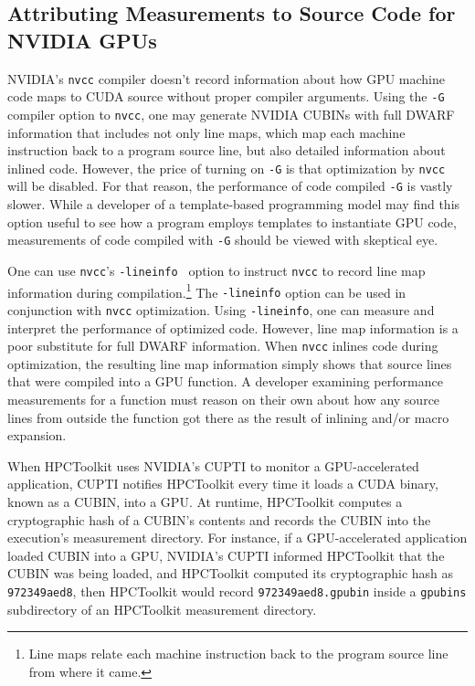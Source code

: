\subsection{Attributing Measurements to Source Code for NVIDIA GPUs}

NVIDIA's {\tt nvcc} compiler doesn't record information about how GPU machine code maps to CUDA source without proper compiler arguments. Using the {\tt -G} compiler option to {\tt nvcc}, one may generate NVIDIA CUBINs with full DWARF information that includes not only line maps, which map each machine instruction back to a program source line, but also detailed information about inlined code. However, the price of turning on {\tt -G} is that optimization by {\tt nvcc} will be disabled. For that reason, the performance of code compiled {\tt -G} is vastly slower. While a developer of a template-based programming model may find this option useful to see how a program employs templates to instantiate GPU code, measurements of code compiled with {\tt -G} should be viewed with skeptical eye.

One can use {\tt nvcc}'s {\tt -lineinfo } option to instruct {\tt nvcc} to record line map information during compilation.\footnote{Line maps relate each machine instruction back to the program source line from where it came.} The {\tt -lineinfo} option can be used in conjunction with {\tt nvcc} optimization. Using {\tt -lineinfo}, one can measure and interpret the performance of optimized code. However, line map information is a poor substitute for full DWARF information. When {\tt nvcc} inlines code during optimization, the resulting line map information simply shows that source lines that were compiled into a GPU function. A developer examining performance measurements for a function must reason on their own about how any source lines from outside the function got there as the result of inlining and/or macro expansion.

When HPCToolkit uses NVIDIA's CUPTI to monitor a GPU-accelerated application,
CUPTI notifies HPCToolkit every time it loads a CUDA binary, known as a CUBIN, into a GPU.
At runtime, HPCToolkit computes a cryptographic hash of a CUBIN's contents and records the CUBIN into the execution's measurement directory.
For instance, if a GPU-accelerated application loaded CUBIN into a GPU, NVIDIA's CUPTI informed HPCToolkit that the CUBIN was being loaded, and HPCToolkit computed its cryptographic hash as {\tt 972349aed8}, then HPCToolkit would record {\tt 972349aed8.gpubin} inside a {\tt gpubins} subdirectory of an HPCToolkit measurement directory.

